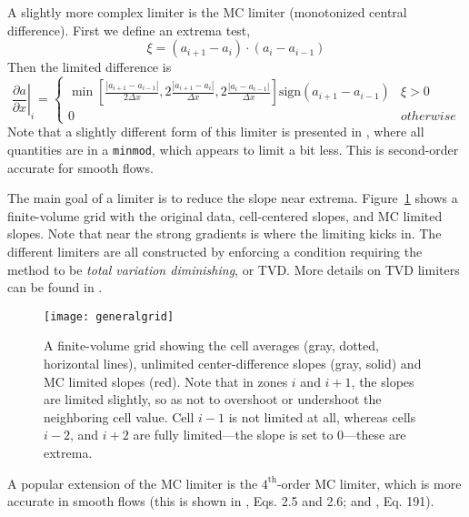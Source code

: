 A slightly more complex limiter is the MC limiter (monotonized central
difference).  First we define an extrema test,
\begin{equation}
\xi = (a_{i+1} - a_i) \cdot (a_i - a_{i-1})
\end{equation}
Then the limited difference is
\begin{equation}
\left . \frac{\partial a}{\partial x} \right |_i =
 \left \{
\begin{array}{ll}
\min \left [ \frac{| a_{i+1} - a_{i-1} |}{2 \Delta x},
              2 \frac{| a_{i+1} - a_i |}{\Delta x},
              2 \frac{| a_{i} - a_{i-1} |}{\Delta x}
      \right ]  \mathrm{sign}(a_{i+1} - a_{i-1}) &  \xi > 0 \\
0 & \mathit{otherwise}
\end{array}
\right .
\end{equation}
%
Note that a slightly different form of this limiter is presented in
\cite{leveque:2002}, where all quantities are in a {\tt minmod}, which appears to limit a bit less.
This is second-order accurate for smooth flows.

The main goal of a limiter is to reduce the slope near extrema.
Figure~\ref{fig:limit} shows a finite-volume grid with the original
data, cell-centered slopes, and MC limited slopes.  Note that near the
strong gradients is where the limiting kicks in.  The different limiters
are all constructed by enforcing a condition requiring the method to be
{\em total variation diminishing}, or TVD.  More details on TVD limiters
can be found in \cite{toro:1997,leveque:2002}.

\begin{figure}
\centering
\texttt{[image: generalgrid]}
\caption[Piecewise linear slopes with an without
  limiting]{\label{fig:limit} A finite-volume grid showing the cell
  averages (gray, dotted, horizontal lines), unlimited center-difference slopes
  (gray, solid) and MC limited slopes (red).  Note that in zones $i$ and
  $i+1$, the slopes are limited slightly, so as not to overshoot or
  undershoot the neighboring cell value.  Cell $i-1$ is not limited at
  all, whereas cells $i-2$, and $i+2$ are fully limited---the slope is
  set to $0$---these are extrema.}
\end{figure}

A popular extension of the MC limiter is the $4^\mathrm{th}$-order MC
limiter, which is more accurate in smooth flows (this is shown in
\cite{colella:1985}, Eqs. 2.5 and 2.6; and \cite{colella:1990},
Eq. 191).

